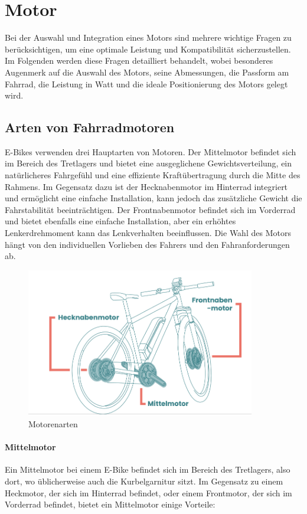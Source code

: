 \chapter{Motor}
Bei der Auswahl und Integration eines Motors sind mehrere wichtige Fragen zu berücksichtigen, um eine optimale Leistung und Kompatibilität sicherzustellen.
Im Folgenden werden diese Fragen detailliert behandelt, wobei besonderes Augenmerk auf die Auswahl des Motors, seine Abmessungen, die Passform am Fahrrad, die Leistung in Watt und die ideale Positionierung des Motors gelegt wird.
\section{Arten von Fahrradmotoren}
E-Bikes verwenden drei Hauptarten von Motoren.
Der Mittelmotor befindet sich im Bereich des Tretlagers und bietet eine ausgeglichene Gewichtsverteilung, ein natürlicheres Fahrgefühl und eine effiziente Kraftübertragung durch die Mitte des Rahmens.
Im Gegensatz dazu ist der Hecknabenmotor im Hinterrad integriert und ermöglicht eine einfache Installation, kann jedoch das zusätzliche Gewicht die Fahrstabilität beeinträchtigen.
Der Frontnabenmotor befindet sich im Vorderrad und bietet ebenfalls eine einfache Installation, aber ein erhöhtes Lenkerdrehmoment kann das Lenkverhalten beeinflussen.
Die Wahl des Motors hängt von den individuellen Vorlieben des Fahrers und den Fahranforderungen ab.
\begin{figure}[h]
    \centering
    \includegraphics[width=10cm]{images/Motor_Arten}
    \caption{Motorenarten\cite{noauthor_e-bike_nodate}}%
    \label{fig:7}
\end{figure}

\subsubsection*{Mittelmotor}
Ein Mittelmotor bei einem E-Bike befindet sich im Bereich des Tretlagers, also dort, wo üblicherweise auch die Kurbelgarnitur sitzt.
Im Gegensatz zu einem Heckmotor, der sich im Hinterrad befindet, oder einem Frontmotor, der sich im Vorderrad befindet, bietet ein Mittelmotor einige Vorteile:\\

